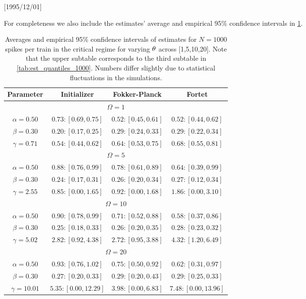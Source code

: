 \NeedsTeXFormat{LaTeX2e}[1995/12/01] \documentclass[10pt]{bmc_article}
\newenvironment{bmcformat}{\begin{raggedright}\baselineskip20pt\sloppy\setboolean{publ}{false}}{\end{raggedright}\baselineskip20pt\sloppy}
\begin{document}
\begin{bmcformat}
For completeness we also include the estimates' average and empirical 95\%
confidence intervals in \cref{tab:thetas_est_quantiles_1000}.
\begin{table}[htp]
\begin{center}
{\begin{tabular}{|c|ccc|} 
Parameter
& Initializer
& Fokker-Planck
& Fortet
\\ 
\hline \hline
\multicolumn{4}{|c|}{$\Omega=1$} \\[1mm]
$\alpha=0.50$
& $0.73 : [0.69, 0.75]$
& $0.52 : [0.45, 0.61]$
& $0.52 : [0.44, 0.62]$
\\
$\beta=0.30$
& $0.20 : [0.17, 0.25]$
& $0.29 : [0.24, 0.33]$
& $0.29 : [0.22, 0.34]$
\\
$\gamma=0.71$
& $0.54 : [0.44, 0.62]$
& $0.64 : [0.53, 0.75]$
& $0.68 : [0.55, 0.81]$
\\
\hline \hline
\multicolumn{4}{|c|}{$\Omega=5$} \\[1mm]
$\alpha=0.50$
& $0.88 : [0.76, 0.99]$
& $0.78 : [0.61, 0.89]$
& $0.64 : [0.39, 0.99]$
\\
$\beta=0.30$
& $0.24 : [0.17, 0.31]$
& $0.26 : [0.20, 0.34]$
& $0.27 : [0.12, 0.34]$
\\
$\gamma=2.55$
& $0.85 : [0.00, 1.65]$
& $0.92 : [0.00, 1.68]$
& $1.86 : [0.00, 3.10]$
\\
\hline \hline
\multicolumn{4}{|c|}{$\Omega=10$} \\[1mm]
$\alpha=0.50$
& $0.90 : [0.78, 0.99]$
& $0.71 : [0.52, 0.88]$
& $0.58 : [0.37, 0.86]$
\\
$\beta=0.30$
& $0.25 : [0.18, 0.33]$
& $0.26 : [0.20, 0.35]$
& $0.28 : [0.23, 0.32]$
\\
$\gamma=5.02$
& $2.82 : [0.92, 4.38]$
& $2.72 : [0.95, 3.88]$
& $4.32 : [1.20, 6.49]$
\\
\hline \hline
\multicolumn{4}{|c|}{$\Omega=20$} \\[1mm]
$\alpha=0.50$
& $0.93 : [0.76, 1.02]$
& $0.75 : [0.50, 0.92]$
& $0.62 : [0.31, 0.97]$
\\
$\beta=0.30$
& $0.27 : [0.20, 0.33]$
& $0.29 : [0.20, 0.43]$
& $0.29 : [0.25, 0.33]$
\\
$\gamma=10.01$
& $5.35 : [0.00, 12.29]$
& $3.98 : [0.00, 6.83]$
& $7.48 : [0.00, 13.96]$
\\
\hline
\end{tabular}}\\
\end{center}
\caption{Averages and empirical 95\% confidence intervals of estimates for $N=1000$
spikes per train in the critical regime for varying ${\theta}$ across
[1,5,10,20]. Note that the upper subtable corresponds to the third
subtable in \cref{tab:est_quantiles_1000}. Numbers differ slightly due to statistical
fluctuations in the simulations. }
\label{tab:thetas_est_quantiles_1000}
\end{table}


\end{bmcformat}
\end{document}
